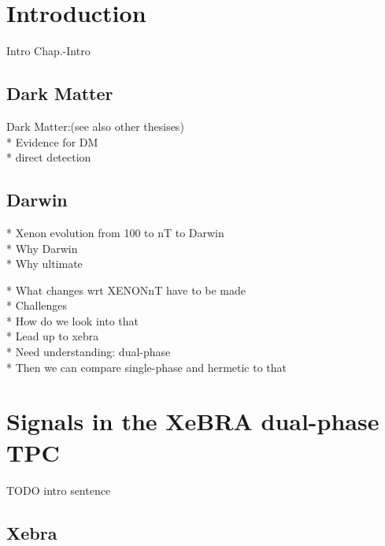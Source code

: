\chapter{Introduction}
\label{chap:Intro}

Intro Chap.-Intro

\FloatBarrier
\section{Dark Matter}
\label{sec:DarkMatter}
\FloatBarrier

Dark Matter:(see also other thesises) \\
* Evidence for DM \\
* direct detection


\newpage
\FloatBarrier
\section{Darwin}
\label{sec:Darwin}
\FloatBarrier

* Xenon evolution from 100 to nT to Darwin \\
* Why Darwin \\
* Why ultimate

* What changes wrt XENONnT have to be made \\
* Challenges \\
* How do we look into that \\
* Lead up to xebra \\
* Need understanding: dual-phase \\
* Then we can compare single-phase and hermetic to that


\newpage
\FloatBarrier
\chapter{Signals in the XeBRA dual-phase TPC}
\label{chap:signals}

TODO intro sentence  %

\newpage
\FloatBarrier
\section{Xebra}
\label{sec:Xebra}
\FloatBarrier

